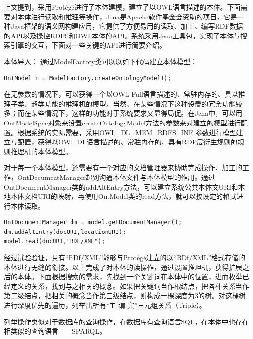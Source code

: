 \documentclass[12pt,a4paper]{article}
\begin{document}
		
	上文提到，采用{\Times Prot{\'e}g{\'e}}进行了本体建模，建立了以{\Times OWL}语言描述的本体。下面需要对本体进行读取和推理等操作，{\Times Jena}是{\Times Apache}软件基金会资助的项目，它是一种{\Times Java}框架的语义网构建应用，它提供了方便易用的读取、加工、编写{\Times RDF}数据的{\Times API}以及操控{\Times RDFS}和{\Times OWL}本体的{\Times API}。系统采用{\Times Jena}工具包，实现了本体与搜索引擎的交互，下面对一些关键的{\Times API}进行简要介绍。

	本体导入：
	通过{\Times ModelFactory}类可以以如下代码建立本体模型：
	
	\lstset{language=Java,frame=lines,basicstyle=\Times, commentstyle=\SimSun}
	\begin{lstlisting}
OntModel m = ModelFactory.createOntologyModel();
	\end{lstlisting}
	
	在无参数的情况下，可以获得一个以{\Times OWL Full}语言描述的、常驻内存的、具以推理子类、超类功能的推理机的模型。当然，在某些情况下这种设置的冗余功能较多；而在某些情况下，这样的功能对于系统要求又显得局促。在{\Times Jena}中，可以用{\Times OntModelSpec}对象来设置{\Times createOntologyModel}方法的参数来对建立的模型进行配置。根据系统的实际需要，采用{\Times OWL\_DL\_MEM\_RDFS\_INF }参数进行模型建立与配置，获得以{\Times OWL DL}语言描述的、常驻内存的、具有{\Times RDF}层衍生规则的规则推理机的本体模型。
	
	对于每一个本体模型，还需要有一个对应的文档管理器来协助完成操作、加工的工作，{\Times OntDocumentManager}起到沟通本体文件与本体模型的作用。通过{\Times OntDocumentManager}类的{\Times addAltEntry}方法，可以建立系统公共本体文{\Times URI}和本地本体文档{\Times URI}的映射，再使用{\Times OntModel}类的{\Times read}方法，就可以按设定的格式进行本体读取。
	
	\begin{lstlisting}
OntDocumentManager dm = model.getDocumentManager();
dm.addAltEntry(docURI,locationURI);
model.read(docURI,"RDF/XML");
	\end{lstlisting}	
	
	经过试验验证，只有“{\Times RDf/XML}”能够与{\Times Prot{\'e}g{\'e}}建立的以“{\Times RDf/XML}”格式存储的本体进行无缝的衔接。以上完成了对本体的读操作，通过设置推理机，获得扩展之后的本体。下面根据搜索的需求，先找到一个关键词在本体中的位置，进而枚举已经定义的关系，找到与之相关的概念。如果把关键词当作根结点，把各种关系当作第二级结点，把相关的概念当作第三级结点，则构成一棵深度为3的树。对这棵树进行深度优先的遍历，列举出所有“主-谓-宾”三元组关系（{\Times Triple}）。
	
	列举操作类似对于数据库的查询操作，在数据库有查询语言{\Times SQL}，在本体中也存在相类似的查询语言——{\Times SPARQL}。
	
\end{document}
